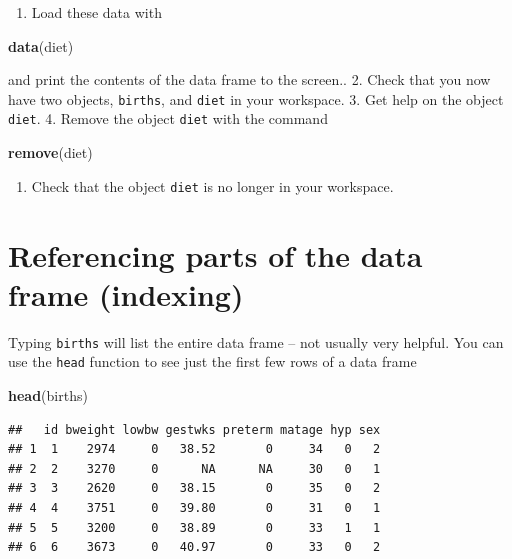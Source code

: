 \documentclass[
]{book}
\newenvironment{Shaded}{\begin{snugshade}}{\end{snugshade}}
\newcommand{\FunctionTok}[1]{\textcolor[rgb]{0.13,0.29,0.53}{\textbf{#1}}}
\newcommand{\NormalTok}[1]{#1}
\providecommand{\tightlist}{%
  \setlength{\itemsep}{0pt}\setlength{\parskip}{0pt}}
\theoremstyle{definition}
\theoremstyle{definition}
\theoremstyle{definition}
\theoremstyle{definition}
\theoremstyle{remark}
\begin{document}
\begin{enumerate}
\def\labelenumi{\arabic{enumi}.}
\tightlist
\item
  Load these data with
\end{enumerate}

\begin{Shaded}
\begin{Highlighting}[]
\FunctionTok{data}\NormalTok{(diet)}
\end{Highlighting}
\end{Shaded}

and print the contents of the data frame to the screen..
2. Check that you now have two objects, \texttt{births}, and \texttt{diet} in your workspace.
3. Get help on the object \texttt{diet}.
4. Remove the object \texttt{diet} with the command

\begin{Shaded}
\begin{Highlighting}[]
\FunctionTok{remove}\NormalTok{(diet)}
\end{Highlighting}
\end{Shaded}

\begin{enumerate}
\def\labelenumi{\arabic{enumi}.}
\setcounter{enumi}{4}
\tightlist
\item
  Check that the object \texttt{diet} is no longer in your workspace.
\end{enumerate}

\section{Referencing parts of the data frame (indexing)}\label{referencing-parts-of-the-data-frame-indexing}

Typing \texttt{births} will list the entire data frame -- not usually
very helpful. You can use the \texttt{head} function to see just the
first few rows of a data frame

\begin{Shaded}
\begin{Highlighting}[]
\FunctionTok{head}\NormalTok{(births)}
\end{Highlighting}
\end{Shaded}

\begin{verbatim}
##   id bweight lowbw gestwks preterm matage hyp sex
## 1  1    2974     0   38.52       0     34   0   2
## 2  2    3270     0      NA      NA     30   0   1
## 3  3    2620     0   38.15       0     35   0   2
## 4  4    3751     0   39.80       0     31   0   1
## 5  5    3200     0   38.89       0     33   1   1
## 6  6    3673     0   40.97       0     33   0   2
\end{verbatim}
\end{document}
